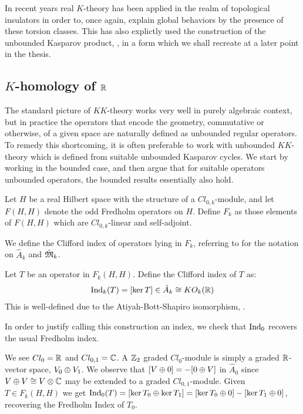 In recent years real $K$-theory has been applied in the realm of topological insulators in order to, once again, explain global behaviors by the presence of these torsion classes. This has also explictly used the construction of the unbounded Kasparov product, \cite{bourne}, in a form which we shall recreate at a later point in the thesis. 
\subsection{$K$-homology of $\mathbb{R}$}
The standard picture of $KK$-theory works very well in purely algebraic context, but in practice the operators that encode the geometry, commutative or otherwise, of a given space are naturally defined as unbounded regular operators. To remedy this shortcoming, it is often preferable to work with unbounded $KK$-theory which is defined from suitable unbounded Kasparov cycles. 
We start by working in the bounded case, and then argue that for suitable operators unbounded operators, the bounded results essentially also hold.  
\begin{definition}
	Let $H$ be a real Hilbert space with the structure of a $Cl_{0,k}$-module, and let $F(H,H)$ denote the odd Fredholm operators on $H$. Define $F_k$ as those elements of $F(H,H)$ which are $Cl_{0,k}$-linear and self-adjoint. 
\end{definition}
We define the Clifford index of operators lying in $F_k$, referring to  for the notation on $\hat{A}_k$ and $\hat{\mathfrak{M}}_k$. 
\begin{definition}
	Let $T$ be an operator in $F_k(H,H)$. Define the Clifford index of $T$ as:
	\begin{align*}
		\operatorname{Ind}_k(T)=[\ker T]\in \hat{A}_k\cong KO_{k}(\mathbb{R})
	\end{align*}
	This is well-defined due to the Atiyah-Bott-Shapiro isomorphism, .
\end{definition}
In order to justify calling this construction an index, we check that $\operatorname{Ind}_0$ recovers the usual Fredholm index. 
\begin{example}\label{cliffordkernel}
	We see $Cl_0=\mathbb{R}$ and $Cl_{0,1}=\mathbb{C}$. A $\mathbb{Z}_2$ graded $Cl_0$-module is simply a graded $\mathbb{R}$-vector space, $V_0\oplus V_1$. We observe that $[V\oplus 0]=-[0\oplus V]$ in $\hat{A}_0$ since $V\oplus V\cong V\otimes \mathbb{C}$ may be extended to a graded $Cl_{0,1}$-module. Given $T\in F_k(H,H)$ we get $\operatorname{Ind}_0(T)=[\ker T_0\oplus \ker T_1]=[\ker T_0 \oplus 0]-[\ker T_1 \oplus 0]$, recovering the Fredholm Index of $T_0$. 
\end{example}
